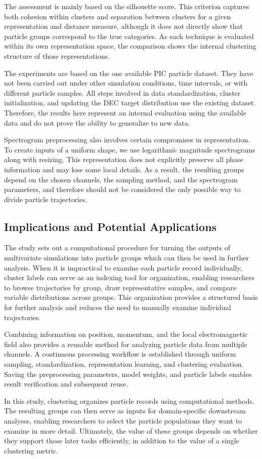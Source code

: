 The assessment is mainly based on the silhouette score. This criterion captures both cohesion within clusters and separation between clusters for a given representation and distance measure, although it does not directly show that particle groups correspond to the true categories. As each technique is evaluated within its own representation space, the comparison shows the internal clustering structure of those representations.

The experiments are based on the one available PIC particle dataset. They have not been carried out under other simulation conditions, time intervals, or with different particle samples. All steps involved in data standardization, cluster initialization, and updating the DEC target distribution use the existing dataset. Therefore, the results here represent an internal evaluation using the available data and do not prove the ability to generalize to new data.

Spectrogram preprocessing also involves certain compromises in representation. To create inputs of a uniform shape, we use logarithmic magnitude spectrograms along with resizing. This representation does not explicitly preserve all phase information and may lose some local details. As a result, the resulting groups depend on the chosen channels, the sampling method, and the spectrogram parameters, and therefore should not be considered the only possible way to divide particle trajectories.

\subsection{Implications and Potential Applications}

The study sets out a computational procedure for turning the outputs of multivariate simulations into particle groups which can then be used in further analysis. When it is impractical to examine each particle record individually, cluster labels can serve as an indexing tool for organization, enabling researchers to browse trajectories by group, draw representative samples, and compare variable distributions across groups. This organization provides a structured basis for further analysis and reduces the need to manually examine individual trajectories.

Combining information on position, momentum, and the local electromagnetic field also provides a reusable method for analyzing particle data from multiple channels. A continuous processing workflow is established through uniform sampling, standardization, representation learning, and clustering evaluation. Saving the preprocessing parameters, model weights, and particle labels enables result verification and subsequent reuse.

In this study, clustering organizes particle records using computational methods. The resulting groups can then serve as inputs for domain-specific downstream analyses, enabling researchers to select the particle populations they want to examine in more detail. Ultimately, the value of these groups depends on whether they support those later tasks efficiently, in addition to the value of a single clustering metric.
